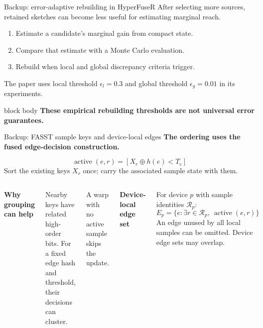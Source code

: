 \documentclass[10pt,aspectratio=169]{beamer}
\newcommand{\takeaway}[1]{%
  \par\vspace{0.20em}
  \begin{beamercolorbox}[wd=\linewidth,sep=0.34em,rounded=true]{block body}%
  \centering\normalsize\bfseries\color{DeepNavy}#1
  \end{beamercolorbox}}
\begin{document}
\begin{frame}{Backup: error-adaptive rebuilding in HyperFuseR}
\relax
After selecting more sources, retained sketches can become less useful for estimating marginal reach.
\par\vspace{0.4cm}
\begin{enumerate}
\item Estimate a candidate's marginal gain from compact state.
\item Compare that estimate with a Monte Carlo evaluation.
\item Rebuild when local and global discrepancy criteria trigger.
\end{enumerate}
\par\vspace{0.3cm}
The paper uses local threshold $\epsilon_l=0.3$ and global threshold $\epsilon_g=0.01$ in its experiments.
\takeaway{These empirical rebuilding thresholds are not universal error guarantees.}
\end{frame}

\begin{frame}{Backup: FASST sample keys and device-local edges}
\setlength{\parskip}{0pt}
\textbf{The ordering uses the fused edge-decision construction.}\par
\[
\operatorname{active}(e,r)=[X_r\oplus h(e)<T_e]
\]
Sort the existing keys $X_r$ once; carry the associated sample state with them.\par
\vspace{0.24cm}
\begin{columns}[T,onlytextwidth]
\setlength{\parskip}{0pt}
\textbf{Why grouping can help}\par
Nearby keys have related high-order bits. For a fixed edge hash and threshold, their decisions can cluster.\par
\vspace{0.20cm}
A warp with no active sample skips the update.\par
{}\setlength{\parskip}{0pt}
\textbf{Device-local edge set}\par
For device $p$ with sample identities $\mathcal R_p$:
\[
E_p=\{e:\exists r\in\mathcal R_p,\ \operatorname{active}(e,r)\}
\]
An edge unused by all local samples can be omitted. Device edge sets may overlap.\par
\end{columns}
\end{frame}
\end{document}
